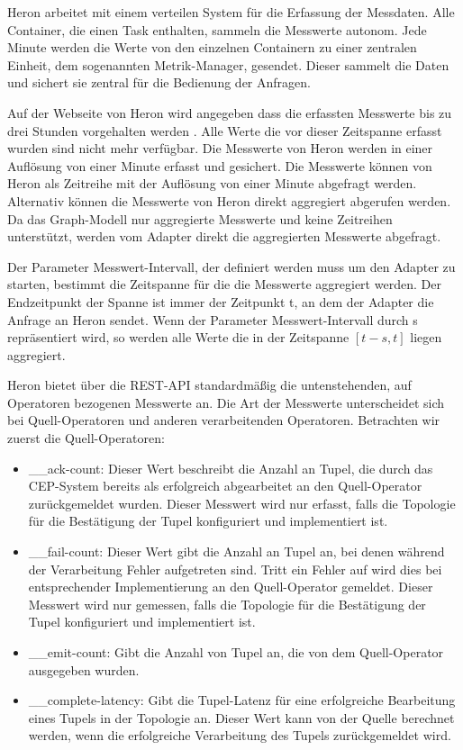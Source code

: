 Heron arbeitet mit einem verteilen System für die Erfassung der Messdaten.
Alle Container, die einen Task enthalten, sammeln die Messwerte autonom.
Jede Minute werden die Werte von den einzelnen Containern zu einer zentralen Einheit, dem sogenannten Metrik-Manager, gesendet.
Dieser sammelt die Daten und sichert sie zentral für die Bedienung der Anfragen.

Auf der Webseite von Heron wird angegeben dass die erfassten Messwerte bis zu drei Stunden vorgehalten werden \cite{noauthor_heron_nodate}.
Alle Werte die vor dieser Zeitspanne erfasst wurden sind nicht mehr verfügbar.
Die Messwerte von Heron werden in einer Auflösung von einer Minute erfasst und gesichert.
Die Messwerte können von Heron als Zeitreihe mit der Auflösung von einer Minute abgefragt werden.
Alternativ können die Messwerte von Heron direkt aggregiert abgerufen werden.
Da das Graph-Modell nur aggregierte Messwerte und keine Zeitreihen unterstützt, werden vom Adapter direkt die aggregierten Messwerte abgefragt.

Der Parameter Messwert-Intervall, der definiert werden muss um den Adapter zu starten, bestimmt die Zeitspanne für die die Messwerte aggregiert werden.
Der Endzeitpunkt der Spanne ist immer der Zeitpunkt t, an dem der Adapter die Anfrage an Heron sendet.
Wenn der Parameter Messwert-Intervall durch s repräsentiert wird, so werden alle Werte die in der Zeitspanne \([t-s, t]\) liegen aggregiert.

Heron bietet über die REST-API standardmäßig die untenstehenden, auf Operatoren bezogenen Messwerte an.
Die Art der Messwerte unterscheidet sich bei Quell-Operatoren und anderen verarbeitenden Operatoren.
Betrachten wir zuerst die Quell-Operatoren:

\begin{itemize}
\item{\_\_ack-count: Dieser Wert beschreibt die Anzahl an Tupel, die durch das CEP-System bereits als erfolgreich abgearbeitet an den Quell-Operator zurückgemeldet wurden. 
Dieser Messwert wird nur erfasst, falls die Topologie für die Bestätigung der Tupel konfiguriert und implementiert ist.}

\item{\_\_fail-count: Dieser Wert gibt die Anzahl an Tupel an, bei denen während der Verarbeitung Fehler aufgetreten sind. Tritt ein Fehler auf wird dies bei entsprechender Implementierung an den Quell-Operator gemeldet. Dieser Messwert wird nur gemessen, falls die Topologie für die Bestätigung der Tupel konfiguriert und implementiert ist.}

\item{\_\_emit-count: Gibt die Anzahl von Tupel an, die von dem Quell-Operator ausgegeben wurden.}

\item{\_\_complete-latency: Gibt die Tupel-Latenz für eine erfolgreiche Bearbeitung eines Tupels in der Topologie an. Dieser Wert kann von der Quelle berechnet werden, wenn die erfolgreiche Verarbeitung des Tupels zurückgemeldet wird.}

\end{itemize}

